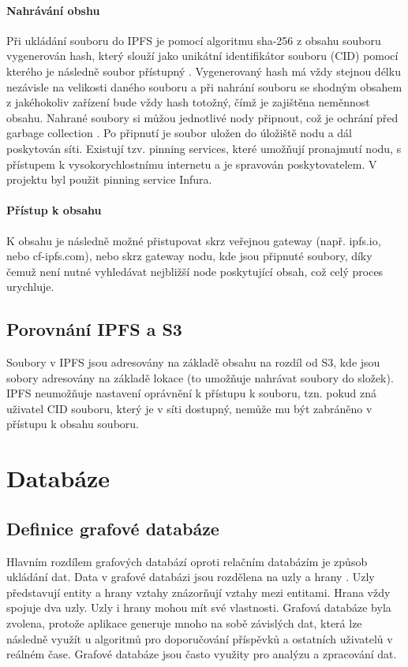 \documentclass[12pt, a4paper,
 twoside,        %
 openright
]{report}
\begin{document}
            \paragraph{Nahrávání obshu}
            Při ukládání souboru do IPFS je pomocí algoritmu sha-256 z obsahu souboru vygenerován hash, který slouží jako unikátní identifikátor souboru (CID) pomocí kterého je následně soubor přístupný \cite{IPFScontentAddressing}. Vygenerovaný hash má vždy stejnou délku nezávisle na velikosti daného souboru a při nahrání souboru se shodným obsahem z jakéhokoliv zařízení bude vždy hash totožný, čímž je zajištěna neměnnost obsahu. Nahrané soubory si můžou jednotlivé nody připnout, což je ochrání před garbage collection \cite{IPFSPersistence}. Po připnutí je soubor uložen do úložiště nodu a dál poskytován síti. Existují tzv. pinning services, které umožňují pronajmutí nodu, s přístupem k vysokorychlostnímu internetu a je spravován poskytovatelem. V projektu byl použit pinning service Infura. 
            \paragraph{Přístup k obsahu} K obsahu je následně možné přistupovat skrz veřejnou gateway (např. ipfs.io, nebo cf-ipfs.com), nebo skrz gateway nodu, kde jsou připnuté soubory, díky čemuž není nutné vyhledávat nejbližší node poskytující obsah, což celý proces urychluje. \cite{IPFSgateways}
        \subsection{Porovnání IPFS a S3}
            Soubory v IPFS jsou adresovány na základě obsahu na rozdíl od S3, kde jsou sobory adresovány na základě lokace (to umožňuje nahrávat soubory do složek). IPFS neumožňuje nastavení oprávnění k přístupu k souboru, tzn. pokud zná uživatel CID souboru, který je v síti dostupný, nemůže mu být zabráněno v přístupu k obsahu souboru.

    \section{Databáze}
    \subsection{Definice grafové databáze}
        Hlavním rozdílem grafových databází oproti relačním databázím je způsob ukládání dat. 
        Data v grafové databázi jsou rozdělena na uzly a hrany \cite{graphenTheorie}. Uzly představují entity a hrany vztahy znázorňují vztahy mezi entitami. Hrana vždy spojuje dva uzly.
        Uzly i hrany mohou mít své vlastnosti. Grafová databáze byla zvolena, protože aplikace generuje mnoho na sobě závislých dat, která
        lze následně využít u algoritmů pro doporučování příspěvků a ostatních uživatelů v reálném čase. Grafové databáze jsou často využity pro analýzu a zpracování dat. \cite{graphDatabasesIntroduction}\cite{graphAlgorithms}
\end{document}
